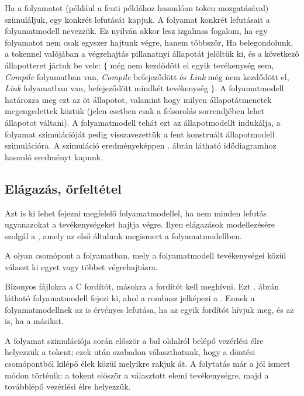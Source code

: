 Ha a folyamatot (például a fenti példához hasonlóan token mozgatásával) szimuláljuk, egy konkrét lefutását kapjuk. A folyamat konkrét lefutásait a folyamatmodell  nevezzük. Ez nyilván akkor lesz izgalmas fogalom, ha egy folyamatot nem csak egyszer hajtunk végre, hanem többször,
Ha belegondolunk, a tokennel valójában a végrehajtás pillanatnyi állapotát jelöltük ki, és a következő állapotteret jártuk be vele: $\{$ még nem kezdődött el egyik tevékenység sem, \emph{Compile} folyamatban van, \emph{Compile} befejeződött és \emph{Link} még nem kezdődött el, \emph{Link} folyamatban van, befejeződött mindkét tevékenység $\}$. A folyamatmodell határozza meg ezt az öt állapotot, valamint hogy milyen állapotátmenetek megengedettek köztük (jelen esetben csak a felsorolás sorrendjében lehet állapotot váltani). A folyamatmodell tehát ezt az állapotmodellt indukálja, a folyamat szimulációját pedig visszavezettük a fent konstruált állapotmodell szimulációra. A szimuláció eredményeképpen . ábrán látható idődiagramhoz hasonló eredményt kapunk.



\subsection{Elágazás, őrfeltétel}
Azt is ki lehet fejezni megfelelő folyamatmodellel, ha nem minden lefutás ugyanazokat a tevékenységeket hajtja végre. Ilyen elágazások modellezésére szolgál a , amely az első általunk megismert  a folyamatmodellben.

\begin{definicio}
	A  olyan csomópont a folyamatban, mely a folyamatmodell tevékenységei közül választ ki egyet vagy többet végrehajtásra.
\end{definicio}

\begin{pelda}
Bizonyos fájlokra a C fordítót, másokra a \cpp fordítót kell meghívni. Ezt . ábrán látható folyamatmodell fejezi ki, ahol a rombusz jelképezi a . Ennek a folyamatmodellnek az is érvényes lefutása, ha az egyik fordítót hívjuk meg, és az is, ha a másikat.

A folyamat szimulációja során először a bal oldalról belépő vezérlési élre helyezzük a tokent; ezek után szabadon választhatunk, hogy a döntési csomópontból kilépő élek közül melyikre rakjuk át. A folytatás már a jól ismert módon történik: a tokent először a választott elemi tevékenységre, majd a továbblépő vezérlési élre helyezzük. 
\end{pelda}

